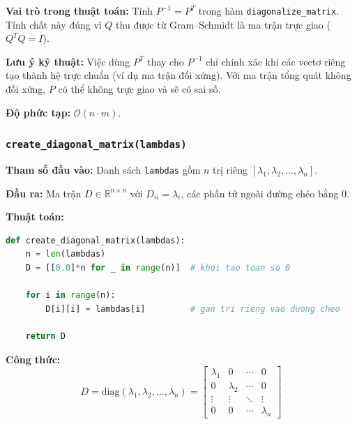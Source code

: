 \documentclass[a4paper,12pt]{report}
\begin{document}
\textbf{Vai trò trong thuật toán:} Tính $P^{-1} = P^T$ trong hàm \texttt{diagonalize\_matrix}. Tính chất này đúng vì $Q$ thu được từ Gram--Schmidt là ma trận trực giao ($Q^T Q = I$).

\smallskip

\textbf{Lưu ý kỹ thuật:} Việc dùng $P^T$ thay cho $P^{-1}$ chỉ chính xác khi các vectơ riêng tạo thành hệ trực chuẩn (ví dụ ma trận đối xứng). Với ma trận tổng quát không đối xứng, $P$ có thể không trực giao và sẽ có sai số.

\smallskip

\textbf{Độ phức tạp:} $\mathcal{O}(n \cdot m)$.

\subsubsection*{\texttt{create\_diagonal\_matrix(lambdas)}}

\smallskip

\textbf{Tham số đầu vào:} Danh sách \texttt{lambdas} gồm $n$ trị riêng $[\lambda_1, \lambda_2, \ldots, \lambda_n]$.

\smallskip

\textbf{Đầu ra:} Ma trận $D \in \mathbb{R}^{n \times n}$ với $D_{ii} = \lambda_i$, các phần tử ngoài đường chéo bằng $0$.

\smallskip

\textbf{Thuật toán:}

\begin{lstlisting}[language=Python, caption={Tạo ma trận đường chéo}]
def create_diagonal_matrix(lambdas):
    n = len(lambdas)
    D = [[0.0]*n for _ in range(n)]  # khoi tao toan so 0

    for i in range(n):
        D[i][i] = lambdas[i]         # gan tri rieng vao duong cheo

    return D
\end{lstlisting}

\textbf{Công thức:}
\[
  D = \mathrm{diag}(\lambda_1, \lambda_2, \ldots, \lambda_n)
  =
  \begin{bmatrix}
    \lambda_1 & 0 & \cdots & 0 \\
    0 & \lambda_2 & \cdots & 0 \\
    \vdots & \vdots & \ddots & \vdots \\
    0 & 0 & \cdots & \lambda_n
  \end{bmatrix}
\]
\end{document}

